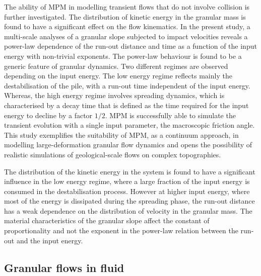 The ability of MPM in modelling transient flows that do not involve collision 
is further investigated. The distribution of kinetic energy in the granular 
mass is found to have a significant effect on the flow kinematics. In the 
present study, a multi-scale analyses of a granular slope subjected to 
impact velocities reveals a power-law dependence of the run-out distance and 
time as a function of the input energy with non-trivial exponents. The 
power-law behaviour is found to be a generic feature of granular dynamics. Two 
different regimes are observed depending on the input energy. The low energy 
regime reflects mainly the destabilisation of the pile, with a run-out time 
independent of the input energy. Whereas, the high energy regime involves 
spreading dynamics, which is characterised by a decay time that is defined as 
the time required for the input energy to  decline by a factor $1/2$. MPM is 
successfully able to simulate the transient evolution with a single 
input parameter, the macroscopic friction angle. This study exemplifies the 
suitability of MPM, as a continuum approach, in modelling large-deformation 
granular flow dynamics and opens the possibility of realistic simulations of 
geological-scale flows on complex topographies.


The distribution of the kinetic energy in the system is found to have a 
significant influence in the low energy regime, where a large 
fraction of the input energy is consumed in the destabilisation process. 
However at higher input energy, where most of the energy is dissipated during 
the spreading phase, the run-out distance has a weak dependence on 
the distribution of velocity in the granular mass. The material characteristics 
of the granular slope affect the constant of proportionality and not the 
exponent in the power-law relation between the run-out and the input energy. 

\subsection{Granular flows in fluid}

